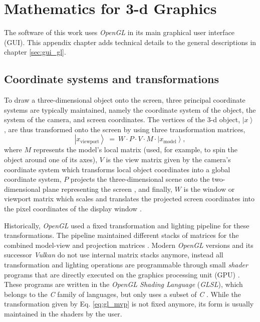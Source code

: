 %
%

\chapter{Mathematics for 3-d Graphics}
\label{ch:gl}

The software of this work uses \textit{OpenGL} \cite{web_OpenGL} in its main graphical user interface (GUI).
This appendix chapter adds technical details to the general descriptions in chapter \ref{sec:gui_gl}.



\section{Coordinate systems and transformations}
To draw a three-dimensional object onto the screen, three principal coordinate systems are typically maintained,
namely the coordinate system of the object, the system of the camera, and screen coordinates.
The vertices of the 3-d object, $\left|x\right>$ , are thus transformed onto the screen by using three
transformation matrices,
\begin{equation}
	\boxed{\left|x_{\mathrm{viewport}}\right> \ =\ W \cdot P \cdot V \cdot  M \cdot  \left| x_{\mathrm{model}} \right>,}
	\label{eq:gl_mvp}
\end{equation}
where $M$ represents the model's local matrix (used, for example, to spin the object around one of its axes),
$V$ is the view matrix given by the camera's coordinate system which transforms local object coordinates into
a global coordinate system, $P$ projects the three-dimensional scene onto the two-dimensional plane
representing the screen \cite{web_gl_ortho, web_gl_perspective}, and finally, $W$ is the window or viewport 
matrix which scales and translates the projected screen coordinates into the pixel coordinates of the 
display window \cite{web_gl_viewport}.

Historically, \textit{OpenGL} used a fixed transformation and lighting pipeline \cite{wiki_gl_history} for
these transformations. The pipeline maintained different stacks of matrices for the combined model-view and
projection matrices \cite{web_gl_matrixmode}.
Modern \textit{OpenGL} \cite{web_OpenGL} versions and its successor \textit{Vulkan} \cite{web_Vulkan} do not 
use internal matrix stacks anymore, instead all transformation and lighting operations are programmable through 
small \textit{shader} programs that are directly executed on the graphics processing unit (GPU) \cite{wiki_gl_history}. 
These programs are written in the \textit{OpenGL Shading Language} (\textit{GLSL}), which belongs to the 
\textit{C} family of languages, but only uses a subset of \textit{C} \cite{wiki_glsl}.
While the transformation given by Eq. \ref{eq:gl_mvp} is not fixed anymore, its form is usually maintained
in the shaders by the user.

